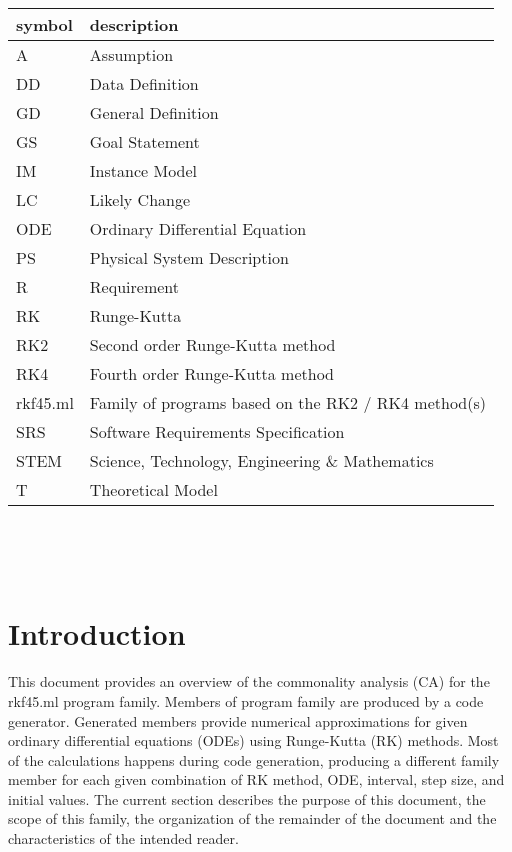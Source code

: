 \documentclass[12pt]{article}
\newcommand{\famname}{rkf45.ml} %
\begin{document}
\renewcommand{\arraystretch}{1.2}
\begin{tabular}{l l} 
  \toprule
  \textbf{symbol} & \textbf{description}\\
  \midrule 
  A & Assumption\\
  DD & Data Definition\\
  GD & General Definition\\
  GS & Goal Statement\\
  IM & Instance Model\\
  LC & Likely Change\\
  ODE & Ordinary Differential Equation\\
  PS & Physical System Description\\
  R & Requirement\\
  RK & Runge-Kutta\\
  RK2 & Second order Runge-Kutta method\\
  RK4 & Fourth order Runge-Kutta method\\
  \famname{} & Family of programs based on the RK2 / RK4 method(s)\\
  SRS & Software Requirements Specification\\
  STEM & Science, Technology, Engineering \& Mathematics\\
  T & Theoretical Model\\
  \bottomrule
\end{tabular}\\

\newpage

\tableofcontents

~\newpage


\section{Introduction}
This document provides an overview of the commonality analysis (CA) for the 
\famname{} program family. Members of program family are produced by a code 
generator. Generated members provide numerical approximations for given 
ordinary differential equations (ODEs) using Runge-Kutta (RK) methods. Most of 
the calculations happens during code generation, producing a different family 
member for each given combination of RK method, ODE, interval, step size, and 
initial values. 
The current section describes the purpose of this document, the scope of this 
family, the organization of the remainder of the document and the 
characteristics of the intended reader.
\end{document}
